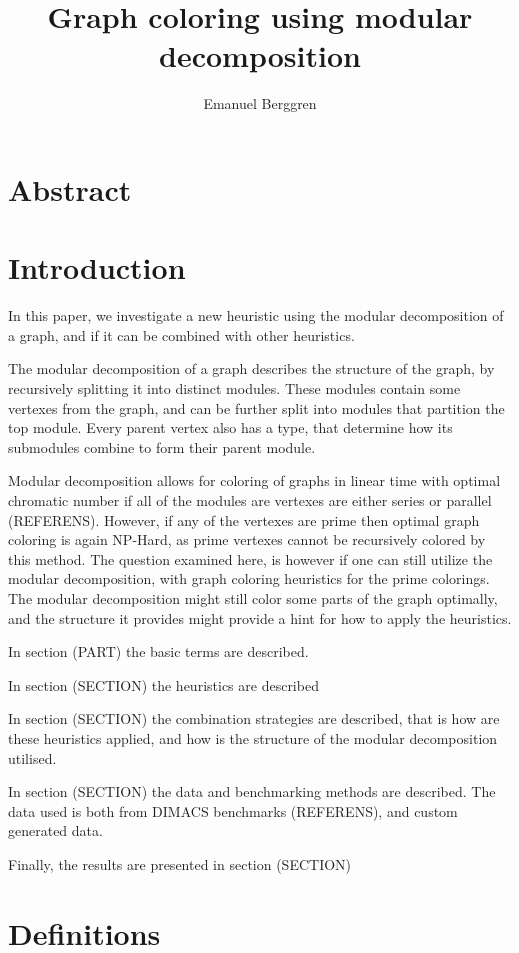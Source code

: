 \documentclass{amsart}
\author{Emanuel Berggren}
\title{Graph coloring using modular decomposition}
\begin{document}
\maketitle

\section{Abstract}

\section{Introduction}

In this paper, we investigate a new heuristic using the modular decomposition of
a graph, and if it can be combined with other heuristics. 

The modular decomposition of a graph describes the structure of the graph, by
recursively splitting it into distinct modules. These modules contain some
vertexes from the graph, and can be further split into modules that partition
the top module. Every parent vertex also has a type, that determine how its submodules
combine to form their parent module.

Modular decomposition allows for coloring of graphs in linear time with optimal
chromatic number if all of the modules are vertexes are either  series or
parallel (REFERENS). However, if any of the vertexes are prime then optimal graph coloring 
is again NP-Hard, as prime vertexes cannot be recursively colored by this
method. The question examined here, is however if one can still utilize the
modular decomposition, with graph coloring heuristics for the prime colorings.
The modular decomposition might still color some parts of the graph optimally,
and the structure it provides might provide a hint for how to apply the
heuristics.

In section (PART) the basic terms are described.

In section (SECTION) the heuristics are described

In section (SECTION) the combination strategies are described, that is how are
these heuristics applied, and how is the structure of the modular decomposition
utilised.

In section (SECTION) the data and benchmarking methods are described. The data
used is both from DIMACS benchmarks (REFERENS), and custom generated data.

Finally, the results are presented in section (SECTION)

\section{Definitions}
\end{document}
